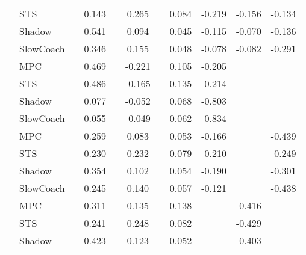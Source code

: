 \begin{tabular}{|l|l|*{9}{c|}}
                                                           & STS &       &     0.143 &        &  0.265 &     &  0.084 &  -0.219 &  -0.156 &   -0.134 \\
                                                           & Shadow &       &     0.541 &        &  0.094 &     &  0.045 &  -0.115 &  -0.070 &   -0.136 \\
                                                           & SlowCoach &       &     0.346 &        &  0.155 &     &  0.048 &  -0.078 &  -0.082 &   -0.291 \\
\midrule
[False, True, False, True, False, True, True, False, False] & MPC &       &     0.469 &        & -0.221 &     &  0.105 &  -0.205 &      &       \\
                                                           & STS &       &     0.486 &        & -0.165 &     &  0.135 &  -0.214 &      &       \\
                                                           & Shadow &       &     0.077 &        & -0.052 &     &  0.068 &  -0.803 &      &       \\
                                                           & SlowCoach &       &     0.055 &        & -0.049 &     &  0.062 &  -0.834 &      &       \\
\midrule
[False, True, False, True, False, True, True, False, True] & MPC &       &     0.259 &        &  0.083 &     &  0.053 &  -0.166 &      &   -0.439 \\
                                                           & STS &       &     0.230 &        &  0.232 &     &  0.079 &  -0.210 &      &   -0.249 \\
                                                           & Shadow &       &     0.354 &        &  0.102 &     &  0.054 &  -0.190 &      &   -0.301 \\
                                                           & SlowCoach &       &     0.245 &        &  0.140 &     &  0.057 &  -0.121 &      &   -0.438 \\
\midrule
[False, True, False, True, False, True, False, True, False] & MPC &       &     0.311 &        &  0.135 &     &  0.138 &      &  -0.416 &       \\
                                                           & STS &       &     0.241 &        &  0.248 &     &  0.082 &      &  -0.429 &       \\
                                                           & Shadow &       &     0.423 &        &  0.123 &     &  0.052 &      &  -0.403 &       \\

\end{tabular}
